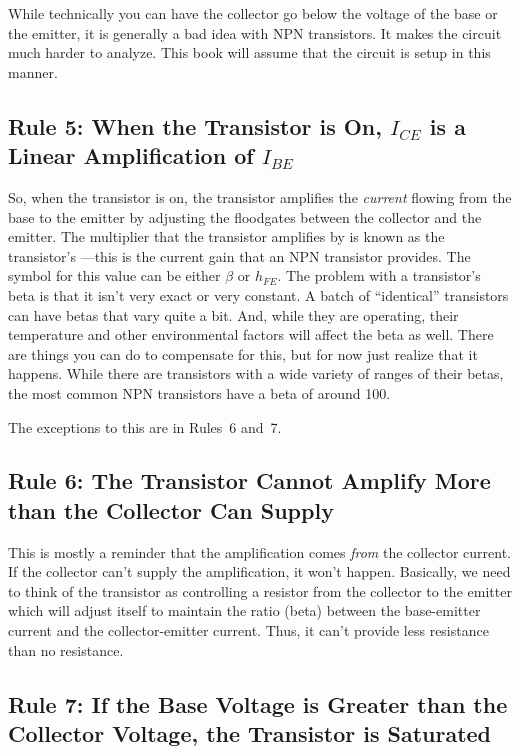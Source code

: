 While technically you can have the collector go below the voltage of the base or the emitter, it is generally a bad idea with NPN transistors.
It makes the circuit much harder to analyze.
This book will assume that the circuit is setup in this manner.

\subsection*{Rule 5: When the Transistor is On, $I_{CE}$ is a Linear Amplification of $I_{BE}$}

So, when the transistor is on, the transistor amplifies the \emph{current} flowing from the base to the emitter by adjusting the floodgates between the collector and the emitter.
The multiplier that the transistor amplifies by is known as the transistor's ---this is the current gain that an NPN transistor provides.  
The symbol for this value can be either $\beta$ or $h_{FE}$.
The problem with a transistor's beta is that it isn't very exact or very constant.
A batch of ``identical'' transistors can have betas that vary quite a bit.
And, while they are operating, their temperature and other environmental factors will affect the beta as well.
There are things you can do to compensate for this, but for now just realize that it happens.
While there are transistors with a wide variety of ranges of their betas, the most common NPN transistors have a beta of around 100.

The exceptions to this are in Rules~6 and~7.

\subsection*{Rule 6: The Transistor Cannot Amplify More than the Collector Can Supply}

This is mostly a reminder that the amplification comes \emph{from} the collector current.
If the collector can't supply the amplification, it won't happen.
Basically, we need to think of the transistor as controlling a resistor from the collector to the emitter which will adjust itself to maintain the ratio (beta) between the base-emitter current and the collector-emitter current.
Thus, it can't provide less resistance than no resistance.

\subsection*{Rule 7: If the Base Voltage is Greater than the Collector Voltage, the Transistor is Saturated}

